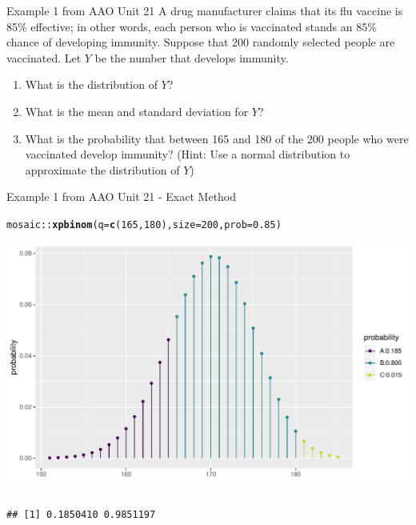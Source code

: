 \documentclass{beamer}\usepackage[]{graphicx}\usepackage[]{color}
\newcommand{\hlnum}[1]{\textcolor[rgb]{0.686,0.059,0.569}{#1}}%
\newcommand{\hlopt}[1]{\textcolor[rgb]{0,0,0}{#1}}%
\newcommand{\hlstd}[1]{\textcolor[rgb]{0.345,0.345,0.345}{#1}}%
\newcommand{\hlkwc}[1]{\textcolor[rgb]{0.333,0.667,0.333}{#1}}%
\newcommand{\hlkwd}[1]{\textcolor[rgb]{0.737,0.353,0.396}{\textbf{#1}}}%
\newenvironment{knitrout}{}{} %
\begin{document}
\begin{frame}{Example 1 from AAO Unit 21}
A drug manufacturer claims that its flu vaccine is 85\% effective; in other words, each person who is vaccinated stands an 85\% chance of developing immunity. Suppose that 200 randomly selected people are vaccinated. Let $Y$ be the number that develops immunity.

\begin{enumerate}
	\item What is the distribution of $Y$?
\item What is the mean and standard deviation for $Y$?
\item What is the probability that between 165 and 180 of the 200 people who were vaccinated
develop immunity? (Hint: Use a normal distribution to approximate the distribution of $Y$)
\end{enumerate}
\end{frame}


\begin{frame}[fragile]{Example 1 from AAO Unit 21 - Exact Method}

\begin{knitrout}\scriptsize
{}\color{fgcolor}
\begin{alltt}
\hlstd{mosaic}\hlopt{::}\hlkwd{xpbinom}\hlstd{(}\hlkwc{q} \hlstd{=} \hlkwd{c}\hlstd{(}\hlnum{165}\hlstd{,} \hlnum{180}\hlstd{),} \hlkwc{size} \hlstd{=} \hlnum{200}\hlstd{,} \hlkwc{prob} \hlstd{=} \hlnum{0.85}\hlstd{)}
\end{alltt}


{\centering \includegraphics[width=1\linewidth]{figure/unnamed-chunk-6-1} 

}


\begin{verbatim}
## [1] 0.1850410 0.9851197
\end{verbatim}

\end{knitrout}
\end{frame}
\end{document}
